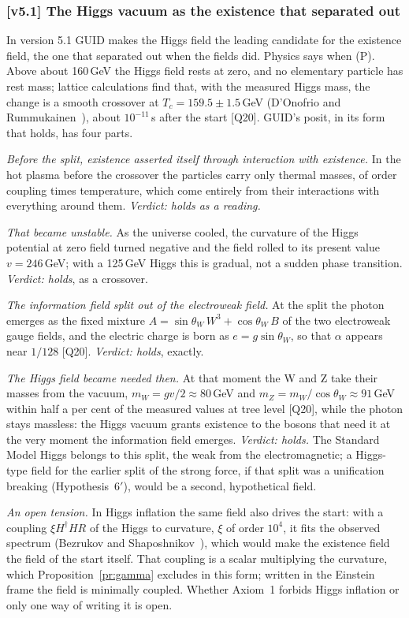 \documentclass[11pt,a4paper]{article}
\theoremstyle{definition}
\theoremstyle{remark}
\newcommand{\chk}[1]{\textsf{[#1]}}
\newcommand{\tagP}{\textsf{(P)}}
\newcommand{\vtag}{{\color{newc}\textsf{\scriptsize[v5.1]}}}
\newenvironment{vnew}{\color{newc}}{}
\theoremstyle{definition}
\begin{document}
\begin{vnew}
\subsubsection*{\vtag{} The Higgs vacuum as the existence that separated out}\label{sec:higgsplit}

In version 5.1 GUID makes the Higgs field the leading candidate for the existence field, the one that separated out when the fields did.
Physics says when \tagP. Above about 160\,GeV the Higgs field rests at zero, and no elementary particle has rest mass; lattice calculations
find that, with the measured Higgs mass, the change is a smooth crossover at $T_c=159.5\pm1.5$\,GeV (D'Onofrio and
Rummukainen~\cite{donofrio}), about $10^{-11}$\,s after the start \chk{Q20}. GUID's posit, in its form that holds, has four parts.

\emph{Before the split, existence asserted itself through interaction with existence.} In the hot plasma before the crossover the particles
carry only thermal masses, of order coupling times temperature, which come entirely from their interactions with everything around them.
\emph{Verdict: holds as a reading.}

\emph{That became unstable.} As the universe cooled, the curvature of the Higgs potential at zero field turned negative and the field
rolled to its present value $v=246$\,GeV; with a 125\,GeV Higgs this is gradual, not a sudden phase transition. \emph{Verdict: holds}, as a
crossover.

\emph{The information field split out of the electroweak field.} At the split the photon emerges as the fixed mixture
$A=\sin\theta_W\,W^3+\cos\theta_W\,B$ of the two electroweak gauge fields, and the electric charge is born as $e=g\sin\theta_W$, so that $\alpha$
appears near $1/128$ \chk{Q20}. \emph{Verdict: holds}, exactly.

\emph{The Higgs field became needed then.} At that moment the W and Z take their masses from the vacuum, $m_W=gv/2\approx80$\,GeV and
$m_Z=m_W/\cos\theta_W\approx91$\,GeV within half a per cent of the measured values at tree level \chk{Q20}, while the photon stays massless:
the Higgs vacuum grants existence to the bosons that need it at the very moment the information field emerges. \emph{Verdict: holds.} The
Standard Model Higgs belongs to this split, the weak from the electromagnetic; a Higgs-type field for the earlier split of the strong force,
if that split was a unification breaking (Hypothesis~6$'$), would be a second, hypothetical field.

\emph{An open tension.} In Higgs inflation the same field also drives the start: with a coupling $\xi H^\dagger HR$ of the Higgs to
curvature, $\xi$ of order $10^4$, it fits the observed spectrum (Bezrukov and Shaposhnikov~\cite{bezrukov}), which would make the
existence field the field of the start itself. That coupling is a scalar multiplying the curvature, which Proposition~\ref{pr:gamma}
excludes in this form; written in the Einstein frame the field is minimally coupled. Whether Axiom~1 forbids Higgs inflation or only one way
of writing it is open.
\end{vnew}
\end{document}
